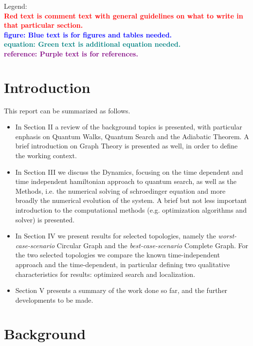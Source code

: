 \documentclass[aps,pra,reprint, onecolumn, showkeys]{revtex4-2}
\newcommand{\red}[1]{\textcolor{red}{#1}}
\newcommand{\blue}[1]{\textcolor{blue}{\textbf{figure: #1}}}
\newcommand{\teal}[1]{\textcolor{teal}{\textbf{equation: #1}}}
\newcommand{\purple}[1]{\textcolor{purple}{\textbf{reference: #1}}}
\begin{document}

Legend: \\
\red{\textbf{Red text is comment text with general guidelines on what to write in that particular section.}}\\
\blue{Blue text is for figures and tables needed.} \\
\teal{Green text is additional equation needed.} \\
\purple{Purple text is for references.}

\section{Introduction}
This report can be summarized as follows.
\begin{itemize}
\item In Section II a review of the background topics is presented, with particular enphasis on Quantum Walks, Quantum Search and the Adiabatic Theorem. A brief introduction on Graph Theory is presented as well, in order to define the working context.
\item In Section III we discuss the Dynamics, focusing on the time dependent and time independent hamiltonian approach to quantum search, as well as the Methods, i.e. the numerical solving of schroedinger equation and more broadly the numerical evolution of the system. A brief but not less important introduction to the computational methods (e.g. optimization algorithms and solver) is presented.
\item In Section IV we present results for selected topologies, namely the \textit{worst-case-scenario} Circular Graph and the \textit{best-case-scenario} Complete Graph. For the two selected topologies we compare the known time-independent approach and the time-dependent, in particular defining two qualitative characteristics for results: optimized search and localization.
\item Section V presents a summary of the work done so far, and the further developments to be made.
\end{itemize}

\section{Background}
\end{document}
